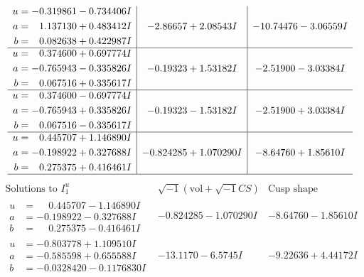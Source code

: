 \documentclass[1p]{elsarticle_modified}
\theoremstyle{definition}
\newcommand{\I}{\sqrt{-1}}
\begin{document}
$$\begin{array}{c|c|c}
\begin{aligned}
u &= -0.319861 - 0.734406 I \\
a &= \phantom{-}1.137130 + 0.483412 I \\
b &= \phantom{-}0.082638 + 0.422987 I\end{aligned}
 & -2.86657 + 2.08543 I & -10.74476 - 3.06559 I \\ \hline\begin{aligned}
u &= \phantom{-}0.374600 + 0.697774 I \\
a &= -0.765943 - 0.335826 I \\
b &= \phantom{-}0.067516 + 0.335617 I\end{aligned}
 & -0.19323 + 1.53182 I & -2.51900 - 3.03384 I \\ \hline\begin{aligned}
u &= \phantom{-}0.374600 - 0.697774 I \\
a &= -0.765943 + 0.335826 I \\
b &= \phantom{-}0.067516 - 0.335617 I\end{aligned}
 & -0.19323 - 1.53182 I & -2.51900 + 3.03384 I \\ \hline\begin{aligned}
u &= \phantom{-}0.445707 + 1.146890 I \\
a &= -0.198922 + 0.327688 I \\
b &= \phantom{-}0.275375 + 0.416461 I\end{aligned}
 & -0.824285 + 1.070290 I & -8.64760 + 1.85610 I\\
 \hline 
 \end{array}$$\newpage$$\begin{array}{c|c|c}  
\text{Solutions to }I^u_{1}& \I (\text{vol} + \sqrt{-1}CS) & \text{Cusp shape}\\
 \hline 
\begin{aligned}
u &= \phantom{-}0.445707 - 1.146890 I \\
a &= -0.198922 - 0.327688 I \\
b &= \phantom{-}0.275375 - 0.416461 I\end{aligned}
 & -0.824285 - 1.070290 I & -8.64760 - 1.85610 I \\ \hline\begin{aligned}
u &= -0.803778 + 1.109510 I \\
a &= -0.585598 + 0.655588 I \\
b &= -0.0328420 - 0.1176830 I\end{aligned}
 & -13.1170 - 6.5745 I & -9.22636 + 4.44172 I \\ \hline\begin{aligned}

\end{aligned}
\end{array}$$
\end{document}
